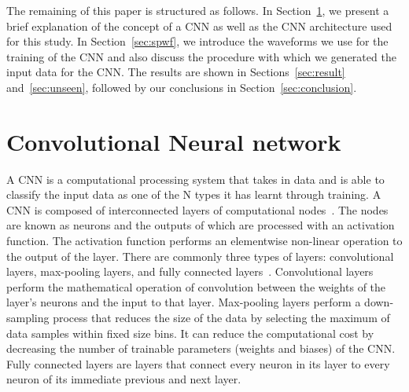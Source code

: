\documentclass[aps,twocolumn,showpacs,groupedaddress, nofootinbib]{revtex4}  %
\begin{document}
%
%
The remaining of this paper is structured as follows. In Section~\ref{sec:CNN},
we present a brief explanation of the concept of a \ac{CNN} as well as the
\ac{CNN} architecture  used for this study. In Section~\ref{sec:spwf}, we
introduce the waveforms we use for the training of the \ac{CNN} and  also
discuss the procedure with which we generated the input data for the \ac{CNN}.
The results are shown in Sections~\ref{sec:result} and~\ref{sec:unseen},
followed by our conclusions in Section~\ref{sec:conclusion}.

\section{Convolutional Neural network}\label{sec:CNN}

%
%
A \ac{CNN} is a computational processing system that takes in data and 
is able to classify the input data as one of the N types it has learnt through training.
A \ac{CNN} is composed of interconnected layers of computational nodes~\cite{o2015introduction}. 
The nodes are known as neurons and the outputs of which are processed with an
activation function. The activation function performs an elementwise non-linear
operation to the output of the layer. 
There are commonly three types of layers: convolutional layers, max-pooling layers, and
fully connected layers~\cite{o2015introduction}. Convolutional layers perform
the mathematical operation of convolution between the weights of the layer's
neurons and the input to that layer. Max-pooling layers perform a down-sampling
process that reduces the size of the data by selecting the maximum of data
samples within fixed size bins. It can reduce the computational cost by
decreasing the number of trainable parameters (weights and biases) of the
\ac{CNN}.  Fully connected layers are layers that connect every neuron in its
layer to every neuron of its immediate previous and next layer. 
\end{document}
